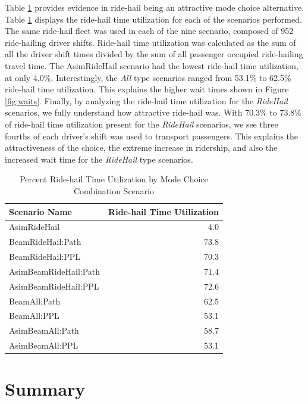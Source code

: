 \documentclass[fancy, masters]{byuthesis}
\begin{document}
Table \ref{tab:timeutil} provides evidence in ride-hail being an attractive mode choice alternative. Table \ref{tab:timeutil} displays the ride-hail time utilization for each of the scenarios performed. The same ride-hail fleet was used in each of the nine scenario, composed of 952 ride-hailing driver shifts. Ride-hail time utilization was calculated as the sum of all the driver shift times divided by the sum of all passenger occupied ride-hailing travel time. The AsimRideHail scenario had the lowest ride-hail time utilization, at only 4.0\%. Interestingly, the \emph{All} type scenarios ranged from 53.1\% to 62.5\% ride-hail time utilization. This explains the higher wait times shown in Figure \ref{fig:waits}. Finally, by analyzing the ride-hail time utilization for the \emph{RideHail} scenarios, we fully understand how attractive ride-hail was. With 70.3\% to 73.8\% of ride-hail time utilization present for the \emph{RideHail} scenarios, we see three fourths of each driver's shift was used to transport passengers. This explains the attractiveness of the choice, the extreme increase in ridership, and also the increased wait time for the \emph{RideHail} type scenarios.

\begin{table}

\caption[Percent Ride-hail Time Utilization]{\label{tab:timeutil}Percent Ride-hail Time Utilization by Mode Choice Combination Scenario}
\centering
\begin{tabular}[t]{lr}
\toprule
Scenario Name & Ride-hail Time Utilization\\
\midrule
AsimRideHail & 4.0\\
BeamRideHail:Path & 73.8\\
BeamRideHail:PPL & 70.3\\
AsimBeamRideHail:Path & 71.4\\
AsimBeamRideHail:PPL & 72.6\\
\addlinespace
BeamAll:Path & 62.5\\
BeamAll:PPL & 53.1\\
AsimBeamAll:Path & 58.7\\
AsimBeamAll:PPL & 53.1\\
\bottomrule
\end{tabular}
\end{table}

\hypertarget{summary-2}{%
\section{Summary}\label{summary-2}}
\end{document}
